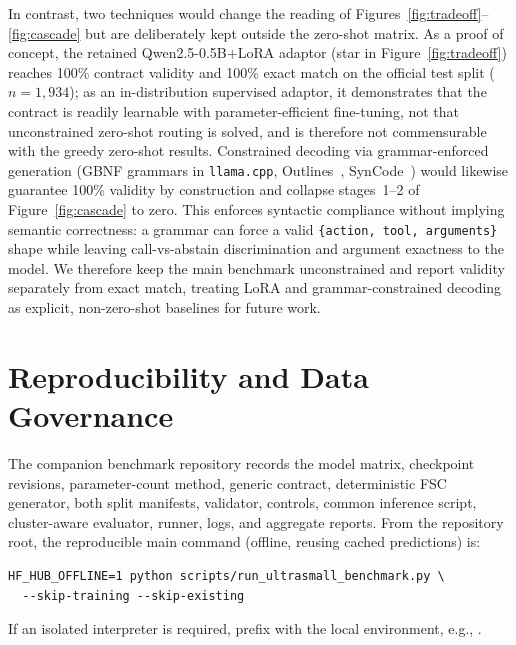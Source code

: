\documentclass[12pt]{article}
\begin{document}
In contrast, two techniques would change the reading of Figures~\ref{fig:tradeoff}--\ref{fig:cascade} but are deliberately kept outside the zero-shot matrix. As a proof of concept, the retained Qwen2.5-0.5B+LoRA adaptor \cite{hu2022} (star in Figure~\ref{fig:tradeoff}) reaches 100\% contract validity and 100\% exact match on the official test split ($n=1{,}934$); as an in-distribution supervised adaptor, it demonstrates that the contract is readily learnable with parameter-efficient fine-tuning, not that unconstrained zero-shot routing is solved, and is therefore not commensurable with the greedy zero-shot results. Constrained decoding via grammar-enforced generation (GBNF grammars in \texttt{llama.cpp}, Outlines~\cite{willard2023outlines}, SynCode~\cite{ugur2025syncode}) would likewise guarantee 100\% validity by construction and collapse stages~1--2 of Figure~\ref{fig:cascade} to zero. This enforces syntactic compliance without implying semantic correctness: a grammar can force a valid \texttt{\{action, tool, arguments\}} shape while leaving call-vs-abstain discrimination and argument exactness to the model. We therefore keep the main benchmark unconstrained and report validity separately from exact match, treating LoRA and grammar-constrained decoding as explicit, non-zero-shot baselines for future work.

\section{Reproducibility and Data Governance}

The companion benchmark repository records the model matrix, checkpoint revisions, parameter-count method, generic contract, deterministic FSC generator, both split manifests, validator, controls, common inference script, cluster-aware evaluator, runner, logs, and aggregate reports. From the repository root, the reproducible main command (offline, reusing cached predictions) is:

{\small
\begin{verbatim}
HF_HUB_OFFLINE=1 python scripts/run_ultrasmall_benchmark.py \
  --skip-training --skip-existing
\end{verbatim}
}
\noindent If an isolated interpreter is required, prefix with the local environment, e.g.,  .
\end{document}
